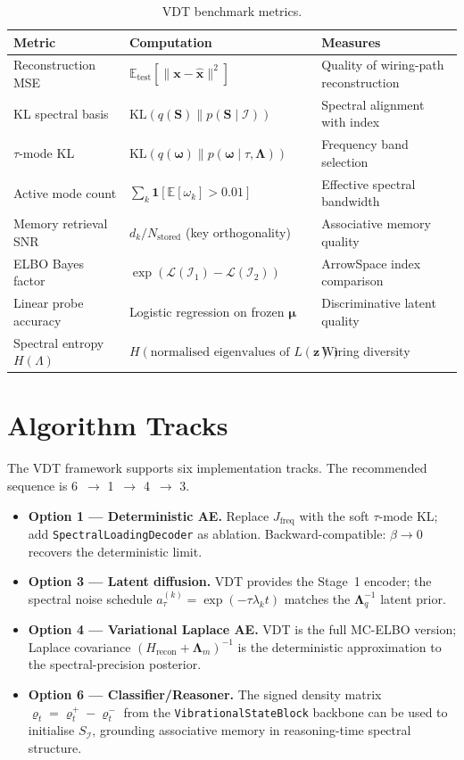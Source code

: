 \documentclass[11pt,a4paper]{article}
\newcommand{\E}{\mathbb{E}}
\newcommand{\KL}{\mathrm{KL}}
\newcommand{\I}{\mathcal{I}}
\newcommand{\elbo}{\mathcal{L}}
\newcommand{\bLambda}{\bm{\Lambda}}
\newcommand{\bS}{\bm{S}}
\newcommand{\bz}{\bm{z}}
\newcommand{\bmu}{\bm{\mu}}
\newcommand{\bomega}{\bm{\omega}}
\newcommand{\bx}{\bm{x}}
\begin{document}
{\begin{table}[h]
\centering
\caption{VDT benchmark metrics.}
\label{tab:metrics}
\begin{tabular}{@{}lll@{}}
\toprule
Metric & Computation & Measures \\
\midrule
Reconstruction MSE & $\E_\text{test}[\|\bx-\hat{\bx}\|^2]$ & Quality of wiring-path reconstruction \\
KL spectral basis & $\KL(q(\bS)\|p(\bS\mid\I))$ & Spectral alignment with index \\
$\tau$-mode KL & $\KL(q(\bomega)\|p(\bomega\mid\tau,\bLambda))$ & Frequency band selection \\
Active mode count & $\sum_k \mathbf{1}[\E[\omega_k]>0.01]$ & Effective spectral bandwidth \\
Memory retrieval SNR & $d_k / N_{\mathrm{stored}}$ (key orthogonality) & Associative memory quality \\
ELBO Bayes factor & $\exp(\elbo(\I_1)-\elbo(\I_2))$ & ArrowSpace index comparison \\
Linear probe accuracy & Logistic regression on frozen $\bmu$ & Discriminative latent quality \\
Spectral entropy $H(\Lambda)$ & $H(\text{normalised eigenvalues of }L(\bz))$ & Wiring diversity \\
\bottomrule
\end{tabular}
\end{table}

\section{Algorithm Tracks}
\label{sec:tracks}

The VDT framework supports six implementation tracks.  The recommended
sequence is 6~$\to$ 1~$\to$ 4~$\to$ 3.

\begin{itemize}
  \item \textbf{Option 1 --- Deterministic AE.}  Replace $J_{\mathrm{freq}}$
        with the soft $\tau$-mode KL; add \texttt{SpectralLoadingDecoder} as
        ablation.  Backward-compatible: $\beta\to 0$ recovers the deterministic
        limit.
  \item \textbf{Option 3 --- Latent diffusion.}  VDT provides the Stage~1
        encoder; the spectral noise schedule
        $a_\tau^{(k)}=\exp(-\tau\lambda_k t)$ matches the $\bLambda_q^{-1}$
        latent prior.
  \item \textbf{Option 4 --- Variational Laplace AE.}  VDT is the full
        MC-ELBO version; Laplace covariance
        $(H_{\mathrm{recon}}+\bLambda_m)^{-1}$ is the deterministic
        approximation to the spectral-precision posterior.
  \item \textbf{Option 6 --- Classifier/Reasoner.}  The signed density matrix
        $\varrho_t=\varrho_t^+-\varrho_t^-$ from the \texttt{VibrationalStateBlock}
        backbone can be used to initialise $S_{\I}$, grounding associative
        memory in reasoning-time spectral structure.
\end{itemize}

}
\end{document}
